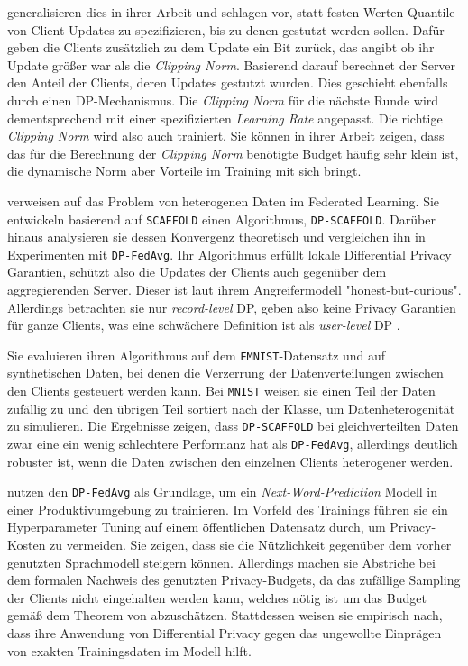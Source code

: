 \textcite{andrew:2021} generalisieren dies in ihrer Arbeit und schlagen vor, statt festen Werten Quantile von Client Updates zu spezifizieren, bis zu denen gestutzt werden sollen. Dafür geben die Clients zusätzlich zu dem Update ein Bit zurück, das angibt ob ihr Update größer war als die \textit{Clipping Norm}. Basierend darauf berechnet der Server den Anteil der Clients, deren Updates gestutzt wurden. Dies geschieht ebenfalls durch einen DP-Mechanismus. Die \textit{Clipping Norm} für die nächste Runde wird dementsprechend mit einer spezifizierten \textit{Learning Rate} angepasst. Die richtige \textit{Clipping Norm} wird also auch trainiert. Sie können in ihrer Arbeit zeigen, dass das für die Berechnung der \textit{Clipping Norm} benötigte Budget häufig sehr klein ist, die dynamische Norm aber Vorteile im Training mit sich bringt.

\textcite{noble:2023} verweisen auf das Problem von heterogenen Daten im Federated Learning. Sie entwickeln basierend auf \texttt{SCAFFOLD} einen Algorithmus, \texttt{DP-SCAFFOLD}. Darüber hinaus analysieren sie dessen Konvergenz theoretisch und vergleichen ihn in Experimenten mit \texttt{DP-FedAvg}. Ihr Algorithmus erfüllt lokale Differential Privacy Garantien, schützt also die Updates der Clients auch gegenüber dem aggregierenden Server. Dieser ist laut ihrem Angreifermodell "honest-but-curious". Allerdings betrachten sie nur \textit{record-level} DP, geben also keine Privacy Garantien für ganze Clients, was eine schwächere Definition ist als \textit{user-level} DP \cite[p.44]{kairouz:2021}.

Sie evaluieren ihren Algorithmus auf dem \texttt{EMNIST}-Datensatz und auf synthetischen Daten, bei denen die Verzerrung der Datenverteilungen zwischen den Clients gesteuert werden kann. Bei \texttt{MNIST} weisen sie einen Teil der Daten zufällig zu und den übrigen Teil sortiert nach der Klasse, um Datenheterogenität zu simulieren. Die Ergebnisse zeigen, dass \texttt{DP-SCAFFOLD} bei gleichverteilten Daten zwar eine ein wenig schlechtere Performanz hat als \texttt{DP-FedAvg}, allerdings deutlich robuster ist, wenn die Daten zwischen den einzelnen Clients heterogener werden.

\textcite{ramaswamy:2020} nutzen den \texttt{DP-FedAvg} als Grundlage, um ein \textit{Next-Word-Prediction} Modell in einer Produktivumgebung zu trainieren. Im Vorfeld des Trainings führen sie ein Hyperparameter Tuning auf einem öffentlichen Datensatz durch, um Privacy-Kosten zu vermeiden. Sie zeigen, dass sie die Nützlichkeit gegenüber dem vorher genutzten Sprachmodell steigern können. Allerdings machen sie Abstriche bei dem formalen Nachweis des genutzten Privacy-Budgets, da das zufällige Sampling der Clients nicht eingehalten werden kann, welches nötig ist um das Budget gemäß dem Theorem von \textcite{wang:2020} abzuschätzen. Stattdessen weisen sie empirisch nach, dass ihre Anwendung von Differential Privacy gegen das ungewollte Einprägen von exakten Trainingsdaten im Modell hilft.

